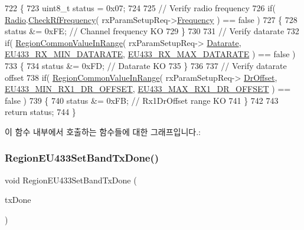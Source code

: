 \begin{DoxyCode}
722 \{
723     uint8\_t status = 0x07;
724 
725     \textcolor{comment}{// Verify radio frequency}
726     \textcolor{keywordflow}{if}( \mbox{\hyperlink{sx1276mb1las_8c_acf9fe61a72c16fa29a0dc449d23e3820}{Radio}}.\mbox{\hyperlink{struct_radio__s_a984f224d5ef26fb8a35f77d664f384df}{CheckRfFrequency}}( rxParamSetupReq->\mbox{\hyperlink{structs_rx_param_setup_req_params_ade3d190636488dad9a89b19446b7acf1}{Frequency}} ) == false )
727     \{
728         status &= 0xFE; \textcolor{comment}{// Channel frequency KO}
729     \}
730 
731     \textcolor{comment}{// Verify datarate}
732     \textcolor{keywordflow}{if}( \mbox{\hyperlink{group___r_e_g_i_o_n_c_o_m_m_o_n_gafdd1c80d953e18d755a631b72a9c3bd3}{RegionCommonValueInRange}}( rxParamSetupReq->
      \mbox{\hyperlink{structs_rx_param_setup_req_params_ae2f6080f3aa0e9485c55513ca56bb24d}{Datarate}}, \mbox{\hyperlink{group___r_e_g_i_o_n_e_u433_ga895971124c9b602ce25f611d37df78a3}{EU433\_RX\_MIN\_DATARATE}}, 
      \mbox{\hyperlink{group___r_e_g_i_o_n_e_u433_ga565b799e9b0922806ddf14fa8518a51b}{EU433\_RX\_MAX\_DATARATE}} ) == false )
733     \{
734         status &= 0xFD; \textcolor{comment}{// Datarate KO}
735     \}
736 
737     \textcolor{comment}{// Verify datarate offset}
738     \textcolor{keywordflow}{if}( \mbox{\hyperlink{group___r_e_g_i_o_n_c_o_m_m_o_n_gafdd1c80d953e18d755a631b72a9c3bd3}{RegionCommonValueInRange}}( rxParamSetupReq->
      \mbox{\hyperlink{structs_rx_param_setup_req_params_ad920e18a48423b1eb1fe40d1b2b082d4}{DrOffset}}, \mbox{\hyperlink{group___r_e_g_i_o_n_e_u433_gad92faa53973ac3aae8a74d648c474291}{EU433\_MIN\_RX1\_DR\_OFFSET}}, 
      \mbox{\hyperlink{group___r_e_g_i_o_n_e_u433_gaea252feca5f849ceb5d54ce51c90cab8}{EU433\_MAX\_RX1\_DR\_OFFSET}} ) == false )
739     \{
740         status &= 0xFB; \textcolor{comment}{// Rx1DrOffset range KO}
741     \}
742 
743     \textcolor{keywordflow}{return} status;
744 \}
\end{DoxyCode}
이 함수 내부에서 호출하는 함수들에 대한 그래프입니다.\+:
\mbox{\label{group___r_e_g_i_o_n_e_u433_gae044b69c6a72fff53e322ba8ffbc9be5}} 
\subsubsection{\texorpdfstring{Region\+E\+U433\+Set\+Band\+Tx\+Done()}{RegionEU433SetBandTxDone()}}
{\footnotesize\ttfamily void Region\+E\+U433\+Set\+Band\+Tx\+Done (\begin{DoxyParamCaption}\item[{\mbox{\hyperlink{group___r_e_g_i_o_n_gad0524aa0673c0814a71e7a4f9cade3fc}{Set\+Band\+Tx\+Done\+Params\+\_\+t}} $\ast$}]{tx\+Done }\end{DoxyParamCaption})}



